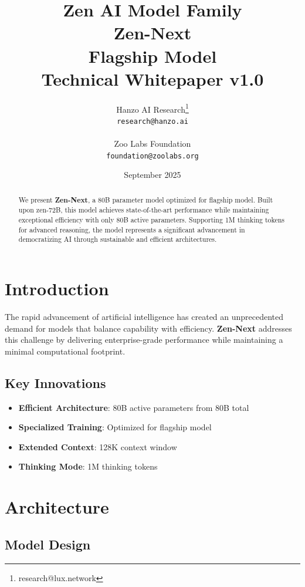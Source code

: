 \documentclass[11pt,a4paper]{article}
\title{
    \vspace{-2cm}
    \Large \textbf{Zen AI Model Family} \\
    \vspace{0.5cm}
    \Huge \textbf{Zen-Next} \\
    \vspace{0.3cm}
    \large Flagship Model \\
    \vspace{0.5cm}
    \normalsize Technical Whitepaper v1.0
}
\author{
    Hanzo AI Research\thanks{research@lux.network} \\
    \texttt{research@hanzo.ai} \\
    \\
    Zoo Labs Foundation \\
    \texttt{foundation@zoolabs.org}
}
\date{September 2025}
\begin{document}
\maketitle

\begin{abstract}
We present \textbf{Zen-Next}, a 80B parameter model optimized for flagship model. 
Built upon zen-72B, this model achieves state-of-the-art performance while maintaining exceptional efficiency 
with only 80B active parameters. Supporting 1M thinking tokens for advanced reasoning, the model represents a significant advancement in democratizing AI through sustainable and efficient architectures.
\end{abstract}

\tableofcontents
\newpage

\section{Introduction}

The rapid advancement of artificial intelligence has created an unprecedented demand for models that balance capability with efficiency. 
\textbf{Zen-Next} addresses this challenge by delivering enterprise-grade performance while maintaining a minimal computational footprint.

\subsection{Key Innovations}
\begin{itemize}
    \item \textbf{Efficient Architecture}: 80B active parameters from 80B total
    \item \textbf{Specialized Training}: Optimized for flagship model
    \item \textbf{Extended Context}: 128K context window
    \item \textbf{Thinking Mode}: 1M thinking tokens
\end{itemize}
    
    

\section{Architecture}

\subsection{Model Design}
\end{document}
